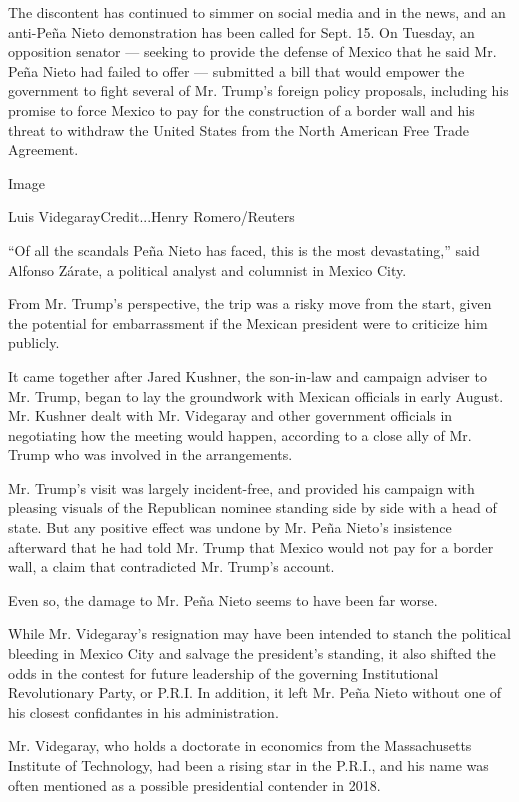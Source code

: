 The discontent has continued to simmer on social media and in the news,
and an anti-Peña Nieto demonstration has been called for Sept. 15. On
Tuesday, an opposition senator --- seeking to provide the defense of
Mexico that he said Mr. Peña Nieto had failed to offer --- submitted a
bill that would empower the government to fight several of Mr. Trump's
foreign policy proposals, including his promise to force Mexico to pay
for the construction of a border wall and his threat to withdraw the
United States from the North American Free Trade Agreement.

Image

Luis VidegarayCredit...Henry Romero/Reuters

``Of all the scandals Peña Nieto has faced, this is the most
devastating,'' said Alfonso Zárate, a political analyst and columnist in
Mexico City.

From Mr. Trump's perspective, the trip was a risky move from the start,
given the potential for embarrassment if the Mexican president were to
criticize him publicly.

It came together after Jared Kushner, the son-in-law and campaign
adviser to Mr. Trump, began to lay the groundwork with Mexican officials
in early August. Mr. Kushner dealt with Mr. Videgaray and other
government officials in negotiating how the meeting would happen,
according to a close ally of Mr. Trump who was involved in the
arrangements.

Mr. Trump's visit was largely incident-free, and provided his campaign
with pleasing visuals of the Republican nominee standing side by side
with a head of state. But any positive effect was undone by Mr. Peña
Nieto's insistence afterward that he had told Mr. Trump that Mexico
would not pay for a border wall, a claim that contradicted Mr. Trump's
account.

Even so, the damage to Mr. Peña Nieto seems to have been far worse.

While Mr. Videgaray's resignation may have been intended to stanch the
political bleeding in Mexico City and salvage the president's standing,
it also shifted the odds in the contest for future leadership of the
governing Institutional Revolutionary Party, or P.R.I. In addition, it
left Mr. Peña Nieto without one of his closest confidantes in his
administration.

Mr. Videgaray, who holds a doctorate in economics from the Massachusetts
Institute of Technology, had been a rising star in the P.R.I., and his
name was often mentioned as a possible presidential contender in 2018.

